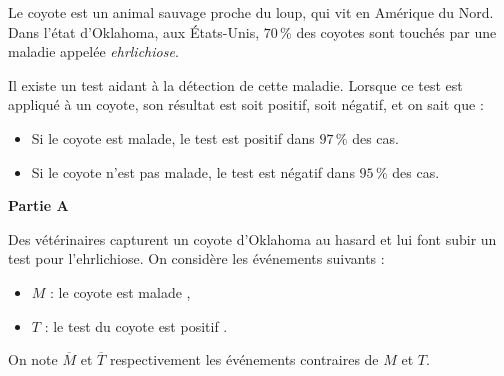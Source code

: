 \documentclass[11pt,a4paper]{article}
\begin{document}
Le coyote est un animal sauvage proche du loup, qui vit en Amérique du Nord. Dans l'état d'Oklahoma, aux États-Unis, $70\,\%$ des coyotes sont touchés par une maladie appelée \emph{ehrlichiose}.

Il existe un test aidant à la détection de cette maladie. Lorsque ce test est appliqué à un coyote, son résultat est soit positif, soit négatif, et on sait que :
\begin{itemize}[label=$\bullet$]
    \item Si le coyote est malade, le test est positif dans $97\,\%$ des cas.
    \item Si le coyote n'est pas malade, le test est négatif dans $95\,\%$ des cas.
\end{itemize}

\textbf{Partie A}

Des vétérinaires capturent un coyote d'Oklahoma au hasard et lui font subir un test pour l'ehrlichiose. On considère les événements suivants :
\begin{itemize}[label=$\bullet$]
    \item $M$ : \og le coyote est malade \fg{},
    \item $T$ : \og le test du coyote est positif \fg{}.
\end{itemize}
On note $\overline{M}$ et $\overline{T}$ respectivement les événements contraires de $M$ et $T$.
\end{document}
